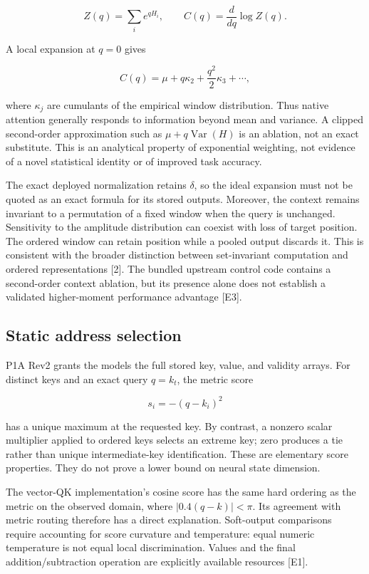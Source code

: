 \documentclass[
  10pt,
]{article}
\begin{document}
\[
Z(q)=\sum_i e^{qH_i},\qquad C(q)=\frac{d}{dq}\log Z(q).
\]

A local expansion at \(q=0\) gives

\[
C(q)=\mu+q\kappa_2+\frac{q^2}{2}\kappa_3+\cdots,
\]

where \(\kappa_j\) are cumulants of the empirical window distribution.
Thus native attention generally responds to information beyond mean and
variance. A clipped second-order approximation such as
\(\mu+q\operatorname{Var}(H)\) is an ablation, not an exact substitute.
This is an analytical property of exponential weighting, not evidence of
a novel statistical identity or of improved task accuracy.

The exact deployed normalization retains \(\delta\), so the ideal
expansion must not be quoted as an exact formula for its stored outputs.
Moreover, the context remains invariant to a permutation of a fixed
window when the query is unchanged. Sensitivity to the amplitude
distribution can coexist with loss of target position. The ordered
window can retain position while a pooled output discards it. This is
consistent with the broader distinction between set-invariant
computation and ordered representations {[}2{]}. The bundled upstream
control code contains a second-order context ablation, but its presence
alone does not establish a validated higher-moment performance advantage
{[}E3{]}.

\subsection{Static address selection}\label{static-address-selection}

P1A Rev2 grants the models the full stored key, value, and validity
arrays. For distinct keys and an exact query \(q=k_t\), the metric score

\[s_i=-(q-k_i)^2\]

has a unique maximum at the requested key. By contrast, a nonzero scalar
multiplier applied to ordered keys selects an extreme key; zero produces
a tie rather than unique intermediate-key identification. These are
elementary score properties. They do not prove a lower bound on neural
state dimension.

The vector-QK implementation's cosine score has the same hard ordering
as the metric on the observed domain, where \(|0.4(q-k)|<\pi\). Its
agreement with metric routing therefore has a direct explanation.
Soft-output comparisons require accounting for score curvature and
temperature: equal numeric temperature is not equal local
discrimination. Values and the final addition/subtraction operation are
explicitly available resources {[}E1{]}.
\end{document}
